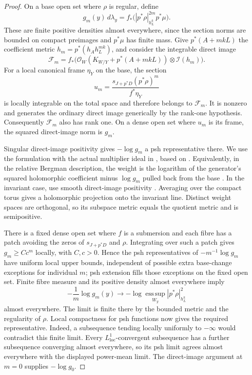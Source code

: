\begin{proof}
On a base open set where $\rho$ is regular, define
\[
 g_m(y)\,d\lambda_y
       =f_*\bigl(|p^*\rho|_{h_L^k}^{2m}p^*\mu\bigr).
\]
These are finite positive densities almost everywhere, since the
section norms are bounded on compact preimages and $p^*\mu$ has finite
mass. Give $p^*(A+mkL)$ the coefficient metric
$h_m=p^*(h_Ah_L^{mk})$, and consider the integrable direct image
\[
 \mathcal F_m=f_*\bigl(\mathcal O_W(K_{W/Y}+p^*(A+mkL))
                         \otimes\mathcal I(h_m)\bigr).
\]
For a local canonical frame $\eta_Y$ on the base, the section
\[
             u_m=\frac{s_{J+p^*D}(p^*\rho)^m}{f^*\eta_Y}
\]
is locally integrable on the total space and therefore belongs to
$\mathcal F_m$. It is nonzero and generates
the ordinary direct image generically by the rank-one hypothesis.
Consequently $\mathcal F_m$ also has rank one. On a dense open set
where $u_m$ is its frame, the squared direct-image norm is $g_m$.

Singular direct-image positivity gives $-\log g_m$ a psh
representative there. We use the formulation with the actual
multiplier ideal in \cite[Theorem~21.1]{HPS}, based on
\cite[Theorem~3.3.5]{PT2018}. Equivalently, in the relative Bergman
description, the weight is the logarithm of the generator's squared
holomorphic coefficient minus $\log g_m$ pulled back from the base
\cite[Theorem~0.1]{BerndtssonPaun2008}.
In the invariant case, use smooth direct-image positivity
\cite[Theorem~1.2]{Berndtsson2009}.  Averaging over the compact torus gives
a holomorphic projection onto the invariant line.  Distinct weight
spaces are orthogonal, so its subspace metric equals the quotient
metric and is semipositive.

There is a fixed dense open set where $f$ is a submersion and each
fibre has a patch avoiding the zeros of $s_{J+p^*D}$ and $\rho$.
Integrating over such a patch gives
$g_m\geq Cc^m$ locally, with $C,c>0$.  Hence the psh representatives of
$-m^{-1}\log g_m$ have uniform local upper bounds, independent of
possible extra base-change exceptions for individual $m$; psh
extension fills those exceptions on the fixed open set.  Finite
fibre measure and its positive density almost everywhere imply
\[
  -\frac1m\log g_m(y)\longrightarrow
  -\log\operatorname*{ess\,sup}_{W_y}|p^*\rho|_{h_L^k}^2
\]
almost everywhere. The limit is finite there by the bounded metric
and the regularity of $\rho$. Local compactness for psh functions
now gives the required representative. Indeed, a subsequence tending
locally uniformly to $-\infty$ would contradict this finite limit.
Every $L^1_{\mathrm{loc}}$-convergent subsequence has a further
subsequence converging almost everywhere, so its psh limit agrees
almost everywhere with the displayed power-mean limit. The direct-image
argument at $m=0$ supplies $-\log g_0$.
\end{proof}


